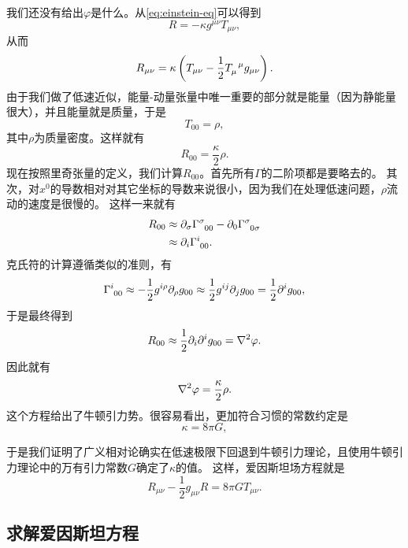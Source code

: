 \documentclass[hyperref, UTF8, a4paper]{ctexart}
\begin{document}
我们还没有给出$\varphi$是什么。从\eqref{eq:einstein-eq}可以得到
\[
    R = - \kappa g^{\mu \nu} T_{\mu \nu},
\]
从而
\[
    R_{\mu \nu} = \kappa \left( T_{\mu \nu} - \frac{1}{2} T\indices{_\mu^\mu} g_{\mu \nu} \right).
\]
由于我们做了低速近似，能量-动量张量中唯一重要的部分就是能量（因为静能量很大），并且能量就是质量，于是
\[
    T_{00} = \rho,
\]
其中$\rho$为质量密度。这样就有
\[
    R_{00} = \frac{\kappa}{2} \rho.
\]
现在按照里奇张量的定义，我们计算$R_{00}$。首先所有$\Gamma$的二阶项都是要略去的。
其次，对$x^0$的导数相对对其它坐标的导数来说很小，因为我们在处理低速问题，$\rho$流动的速度是很慢的。
这样一来就有
\[
    \begin{aligned}
        R_{00} &\approx \partial_\sigma \Gamma\indices{^\sigma_{00}} - \partial_0 \Gamma\indices{^\sigma_{0 \sigma}} \\
        &\approx \partial_i \Gamma\indices{^i_{00}}.
    \end{aligned}
\]
克氏符的计算遵循类似的准则，有
\[
    \Gamma\indices{^i_{00}} \approx - \frac{1}{2} g^{i \rho} \partial_\rho g_{00} \approx \frac{1}{2} g^{i j} \partial_j g_{00} = \frac{1}{2} \partial^i g_{00},
\]
于是最终得到
\[
    R_{00} \approx \frac{1}{2} \partial_i \partial^i g_{00} = \laplacian \varphi.
\]
因此就有
\begin{equation}
    \laplacian \varphi = \frac{\kappa}{2} \rho.
\end{equation}
这个方程给出了牛顿引力势。很容易看出，更加符合习惯的常数约定是
\begin{equation}
    \kappa = 8 \pi G,
\end{equation}

于是我们证明了广义相对论确实在低速极限下回退到牛顿引力理论，且使用牛顿引力理论中的万有引力常数$G$确定了$\kappa$的值。
这样，爱因斯坦场方程就是
\begin{equation}
    R_{\mu \nu} - \frac{1}{2} g_{\mu \nu} R = 8 \pi G T_{\mu \nu}.
\end{equation}

\subsection{求解爱因斯坦方程}
\end{document}

